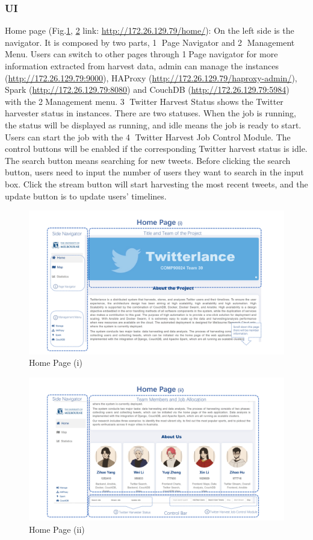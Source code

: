 \subsubsection{UI}
Home page (Fig.\ref{UserGuid1}, \ref{UserGuid2} link: \url{http://172.26.129.79/home/}): On the left side is the navigator. It is composed by two parts, \textcircled{1} Page Navigator and \textcircled{2} Management Menu. Users can switch to other pages through \textcircled{1}Page navigator for more information extracted from harvest data, admin can manage the instances (\url{http://172.26.129.79:9000}), HAProxy (\url{http://172.26.129.79/haproxy-admin/}), Spark (\url{http://172.26.129.79:8080}) and CouchDB (\url{http://172.26.129.79:5984}) with the \textcircled{2}Management menu. \textcircled{3} Twitter Harvest Status shows the Twitter harvester status in instances. There are two statuses. When the job is running, the status will be displayed as running, and idle means the job is ready to start. Users can start the job with the \textcircled{4} Twitter Harvest Job Control Module. The control buttons will be enabled if the corresponding Twitter harvest status is idle. The search button means searching for new tweets. Before clicking the search button, users need to input the number of users they want to search in the input box. Click the stream button will start harvesting the most recent tweets, and the update button is to update users’ timelines.
\begin{figure}
\centerline{\includegraphics[width=7in]{Figures/UserGuid1.JPG}}
\caption{Home Page (i)}
\label{UserGuid1}
\end{figure}

\begin{figure}
\centerline{\includegraphics[width=7in]{Figures/UserGuide2.JPG}}
\caption{Home Page (ii)}
\label{UserGuid2}
\end{figure}

